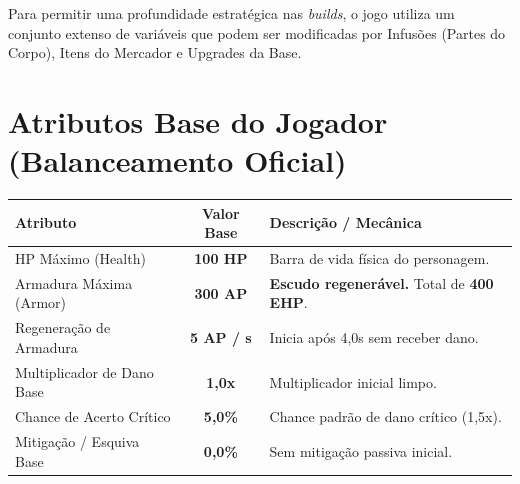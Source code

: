 \documentclass[a4paper,12pt]{report}
\begin{document}
Para permitir uma profundidade estratégica nas \textit{builds}, o jogo utiliza um conjunto extenso de variáveis que podem ser modificadas por Infusões (Partes do Corpo), Itens do Mercador e Upgrades da Base.

\section{Atributos Base do Jogador (Balanceamento Oficial)}
\begin{center}
\begin{tabular}{|l|c|l|}
    \hline
    \textbf{Atributo} & \textbf{Valor Base} & \textbf{Descrição / Mecânica} \\
    \hline
    HP Máximo (Health) & \textbf{100 HP} & Barra de vida física do personagem. \\
    Armadura Máxima (Armor) & \textbf{300 AP} & \textbf{Escudo regenerável.} Total de \textbf{400 EHP}. \\
    Regeneração de Armadura & \textbf{5 AP / s} & Inicia após 4,0s sem receber dano. \\
    Multiplicador de Dano Base & \textbf{1,0x} & Multiplicador inicial limpo. \\
    Chance de Acerto Crítico & \textbf{5,0\%} & Chance padrão de dano crítico (1,5x). \\
    Mitigação / Esquiva Base & \textbf{0,0\%} & Sem mitigação passiva inicial. \\
    \hline
\end{tabular}
\end{center}
\end{document}
